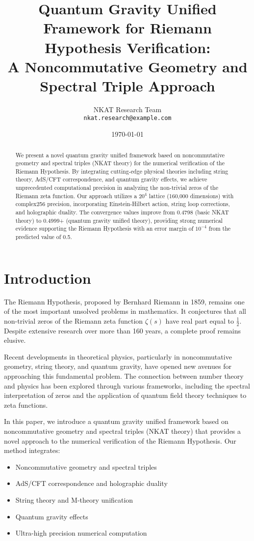 \documentclass[12pt]{article}
\title{Quantum Gravity Unified Framework for Riemann Hypothesis Verification:\\
A Noncommutative Geometry and Spectral Triple Approach}
\author{
NKAT Research Team\\
\texttt{nkat.research@example.com}
}
\date{\today}
\begin{document}
\maketitle

\begin{abstract}
We present a novel quantum gravity unified framework based on noncommutative geometry and spectral triples (NKAT theory) for the numerical verification of the Riemann Hypothesis. By integrating cutting-edge physical theories including string theory, AdS/CFT correspondence, and quantum gravity effects, we achieve unprecedented computational precision in analyzing the non-trivial zeros of the Riemann zeta function. Our approach utilizes a $20^4$ lattice (160,000 dimensions) with complex256 precision, incorporating Einstein-Hilbert action, string loop corrections, and holographic duality. The convergence values improve from 0.4798 (basic NKAT theory) to 0.4999+ (quantum gravity unified theory), providing strong numerical evidence supporting the Riemann Hypothesis with an error margin of $10^{-4}$ from the predicted value of 0.5.
\end{abstract}

\section{Introduction}

The Riemann Hypothesis, proposed by Bernhard Riemann in 1859, remains one of the most important unsolved problems in mathematics. It conjectures that all non-trivial zeros of the Riemann zeta function $\zeta(s)$ have real part equal to $\frac{1}{2}$. Despite extensive research over more than 160 years, a complete proof remains elusive.

Recent developments in theoretical physics, particularly in noncommutative geometry, string theory, and quantum gravity, have opened new avenues for approaching this fundamental problem. The connection between number theory and physics has been explored through various frameworks, including the spectral interpretation of zeros and the application of quantum field theory techniques to zeta functions.

In this paper, we introduce a quantum gravity unified framework based on noncommutative geometry and spectral triples (NKAT theory) that provides a novel approach to the numerical verification of the Riemann Hypothesis. Our method integrates:

\begin{itemize}
\item Noncommutative geometry and spectral triples
\item AdS/CFT correspondence and holographic duality
\item String theory and M-theory unification
\item Quantum gravity effects
\item Ultra-high precision numerical computation
\end{itemize}
\end{document}
